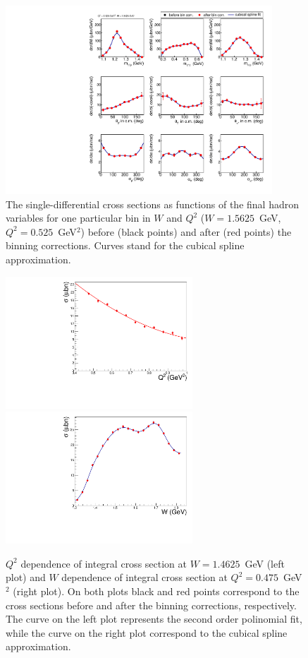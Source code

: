 \begin{figure}[htp]
\begin{center}
\includegraphics[width=10cm]{pictures/bin_corr/bin_corr_1d.pdf}
\caption{\small The single-differential cross sections as functions of the final hadron variables for one particular bin in $W$ and $Q^{2}$ ($W = 1.5625$~GeV, $Q^{2} = 0.525$~GeV$^{2}$) before  (black points) and after (red points) the binning corrections. Curves stand for the cubical spline approximation.} \label{fig:bincor_1d}
\end{center}
\end{figure}

\begin{figure}[htp]
\begin{center}
\includegraphics[width=7cm]{pictures/bin_corr/q2_fit.pdf}
\includegraphics[width=7cm]{pictures/bin_corr/w_spline.pdf}
\caption{\small $Q^{2}$ dependence of integral cross section at $W = 1.4625$~GeV (left plot) and $W$ dependence of integral cross section at $Q^{2} = 0.475$~GeV$^{2}$ (right plot). On both plots black and red points correspond to the cross sections before and after the binning corrections, respectively. The curve on the left plot represents the second order polinomial fit, while the curve on the right plot correspond to the cubical spline approximation.} \label{fig:bincor_w_q2}
\end{center}
\end{figure}

